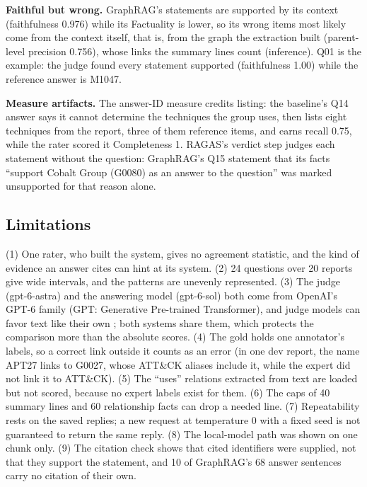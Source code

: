 \documentclass[conference,letterpaper]{IEEEtran}
\begin{document}
\textbf{Faithful but wrong.} GraphRAG's statements are supported by its context (faithfulness 0.976) while its Factuality is lower, so its wrong items most likely come from the context itself, that is, from the graph the extraction built (parent-level precision 0.756), whose links the summary lines count (inference). Q01 is the example: the judge found every statement supported (faithfulness 1.00) while the reference answer is M1047.

\textbf{Measure artifacts.} The answer-ID measure credits listing: the baseline's Q14 answer says it cannot determine the techniques the group uses, then lists eight techniques from the report, three of them reference items, and earns recall 0.75, while the rater scored it Completeness 1. RAGAS's verdict step judges each statement without the question: GraphRAG's Q15 statement that its facts ``support Cobalt Group (G0080) as an answer to the question'' was marked unsupported for that reason alone.

\subsection{Limitations}
(1) One rater, who built the system, gives no agreement statistic, and the kind of evidence an answer cites can hint at its system. (2) 24 questions over 20 reports give wide intervals, and the patterns are unevenly represented. (3) The judge (gpt-6-astra) and the answering model (gpt-6-sol) both come from OpenAI's GPT-6 family (GPT: Generative Pre-trained Transformer), and judge models can favor text like their own \cite{zheng2023,panickssery2024,wataoka2024}; both systems share them, which protects the comparison more than the absolute scores. (4) The gold holds one annotator's labels, so a correct link outside it counts as an error (in one dev report, the name APT27 links to G0027, whose ATT\&CK aliases include it, while the expert did not link it to ATT\&CK). (5) The ``uses'' relations extracted from text are loaded but not scored, because no expert labels exist for them. (6) The caps of 40 summary lines and 60 relationship facts can drop a needed line. (7) Repeatability rests on the saved replies; a new request at temperature 0 with a fixed seed is not guaranteed to return the same reply. (8) The local-model path was shown on one chunk only. (9) The citation check shows that cited identifiers were supplied, not that they support the statement, and 10 of GraphRAG's 68 answer sentences carry no citation of their own.
\end{document}
